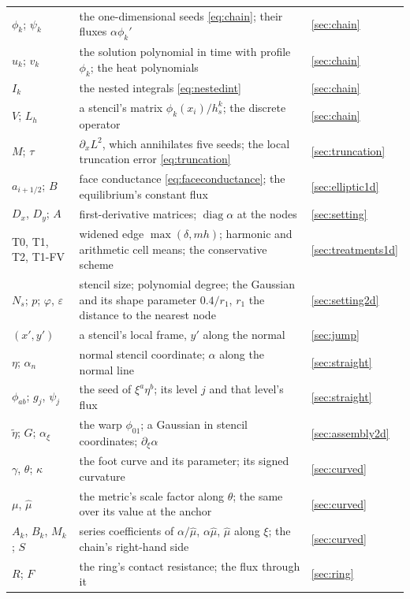 \documentclass[11pt]{amsart}
\theoremstyle{definition}
\theoremstyle{remark}
\newcommand{\px}{\partial_x}
\begin{document}
\begin{center}
\begin{tabular}{@{}lp{}l@{}}
$\phi_k$; $\psi_k$ & the one-dimensional seeds \eqref{eq:chain}; their
  fluxes $\alpha \phi_k'$ & \ref{sec:chain} \\
$u_k$; $v_k$ & the solution polynomial in time with profile $\phi_k$; the
  heat polynomials & \ref{sec:chain} \\
$I_k$ & the nested integrals \eqref{eq:nestedint} & \ref{sec:chain} \\
$V$; $L_h$ & a stencil's matrix $\phi_k(x_i) / h_s^k$; the discrete
  operator & \ref{sec:chain} \\
$M$; $\tau$ & $\px L^2$, which annihilates five seeds; the local
  truncation error \eqref{eq:truncation} & \ref{sec:truncation} \\
$a_{i+1/2}$; $B$ & face conductance \eqref{eq:faceconductance}; the
  equilibrium's constant flux & \ref{sec:elliptic1d} \\
$D_x$, $D_y$; $A$ & first-derivative matrices; $\operatorname{diag}
  \alpha$ at the nodes & \ref{sec:setting} \\
T0, T1, T2, T1-FV & widened edge $\max(\delta, m h)$; harmonic and
  arithmetic cell means; the conservative scheme & \ref{sec:treatments1d}
  \\
$N_s$; $p$; $\varphi$, $\varepsilon$ & stencil size; polynomial degree;
  the Gaussian and its shape parameter $0.4 / r_1$, $r_1$ the distance to
  the nearest node & \ref{sec:setting2d} \\
$(x', y')$ & a stencil's local frame, $y'$ along the normal &
  \ref{sec:jump} \\
$\eta$; $\alpha_n$ & normal stencil coordinate; $\alpha$ along the normal
  line & \ref{sec:straight} \\
$\phi_{ab}$; $g_j$, $\psi_j$ & the seed of $\xi^a \eta^b$; its level $j$
  and that level's flux & \ref{sec:straight} \\
$\tilde\eta$; $G$; $\alpha_\xi$ & the warp $\phi_{01}$; a Gaussian in
  stencil coordinates; $\partial_\xi \alpha$ &
  \ref{sec:assembly2d} \\
$\gamma$, $\theta$; $\kappa$ & the foot curve and its parameter; its
  signed curvature & \ref{sec:curved} \\
$\mu$, $\hat\mu$ & the metric's scale factor along $\theta$; the same
  over its value at the anchor & \ref{sec:curved} \\
$A_k$, $B_k$, $M_k$; $S$ & series coefficients of $\alpha / \hat\mu$,
  $\alpha \hat\mu$, $\hat\mu$ along $\xi$; the chain's right-hand side &
  \ref{sec:curved} \\
$R$; $F$ & the ring's contact resistance; the flux through it &
  \ref{sec:ring} \\
\bottomrule
\end{tabular}
\end{center}
\end{document}
